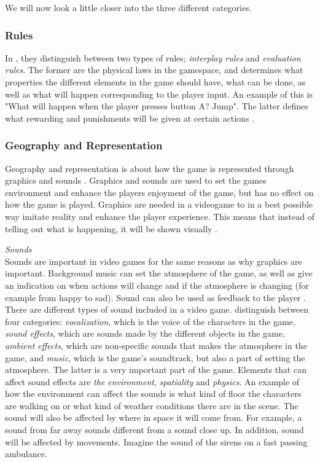 We will now look a little closer into the three different categories.

\subsubsection{Rules}
In \cite{understandingvg}, they distinguish between two types of rules; \emph{interplay rules} and \emph{evaluation rules}. The former are the physical laws in the gamespace, and determines what properties the different elements in the game should have, what can be done, as well as what will happen corresponding to the player input. An example of this is "What will happen when the player presses button A? Jump". The latter defines what rewarding and punishments will be given at certain actions \cite{understandingvg}. 

\subsubsection{Geography and Representation}
\label{sec:georep}
Geography and representation is about how the game is represented through graphics and sounds \cite{understandingvg}. Graphics and sounds are used to set the games environment and enhance the players enjoyment of the game, but has no effect on how the game is played. Graphics are needed in a videogame to in a best possible way imitate reality and enhance the player experience. This means that instead of telling out what is happening, it will be shown visually \cite{umlapproach}. 

\emph{Sounds}\\
Sounds are important in video games for the same reasons as why graphics are important. Background music can set the atmosphere of the game, as well as give an indication on when actions will change and if the atmosphere is changing (for example from happy to sad). Sound can also be used as feedback to the player \cite{umlapproach}. There are different types of sound included in a  video game. \cite{understandingvg} distinguish between four categories:
\emph{vocalization}, which is the voice of the characters in the game,
\emph{sound effects}, which are sounds made by the different objects in the game, \emph{ambient effects}, which are non-specific sounds that makes the atmosphere in the game, and \emph{music}, which is the game’s soundtrack, but also a part of setting the atmosphere. The latter is a very important part of the game. Elements that can affect sound effects are \emph{the environment}, \emph{spatiality} and \emph{physics}. An example of how the environment can affect the sounds is what kind of floor the characters are walking on or what kind of weather conditions there are in the scene. The sound will also be affected by where in space it will come from. For example, a sound from far away sounds different from a sound close up. In addition, sound will be affected by movements. Imagine the sound of the sirens on a fast passing ambulance.

